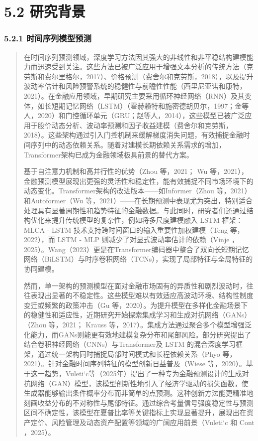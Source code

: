 \section{5.2 研究背景}

\subsubsection{5.2.1
时间序列模型预测}

\begin{quote}
在时间序列预测领域，深度学习方法因其强大的非线性和非平稳结构建模能力而迅速受到关注。这些方法已被广泛应用于增强文本分析的传统方法（克劳斯和费尔里格尔，2017）、价格预测（费舍尔和克劳斯，2018），以及提升波动率估计和风险预警系统的稳健性与前瞻性性能（西里尼亚诺和康特，2021）。在金融应用领域，早期研究主要采用循环神经网络（RNN）及其变体，如长短期记忆网络（LSTM）（霍赫赖特和施密德胡贝尔，1997；金等人，2020）和门控循环单元（GRU；赵等人，2014），这些模型已被广泛应用于股价动态分析、波动率预测和因子收益建模（费舍尔和克劳斯，2018）。这些架构通过引入门控机制来缓解梯度消失问题，有效捕捉金融时间序列中的动态依赖关系。随着对建模长期依赖关系需求的增加，Transformer架构已成为金融领域极具前景的替代方案。

基于自注意力机制和高并行性的优势（Zhou 等，2021； Wu
等，2021），金融预测模型展现出更强的灵活性和稳定性，能有效捕捉不同市场环境下的动态变化。Transformer架构的改进版本------如Informer（Zhou
等，2021）和Autoformer（Wu
等，2021）------在长期预测中表现尤为突出，特别适合处理具有显著周期性和趋势特征的金融数据。与此同时，研究者们还通过结构优化来提升传统模型的复杂性，例如将多尺度建模融入
LSTM 框架： MLCA - LSTM 技术支持跨时间窗口的输入重要性加权建模（Teng
等，2022），而 LSTM - MLP 则减少了对显式波动率估计的依赖（Vinje
，2025）。Wang（2023）更是在Transformer编码器中整合了双向长短期记忆网络（BiLSTM）与时序卷积网络（TCNs），实现了局部特征与全局特征的协同建模。

然而，单一架构的预测模型在面对金融市场固有的异质性和剧烈波动时，往往表现出显著的不稳定性。这些模型难以有效适应高波动环境、结构性制度变迁或频繁的政策冲击（Gu
等，2020）。为提升模型在多样化金融场景下的稳健性和适应性，近期研究开始探索集成学习和生成对抗网络（GANs）（Zhou
等，2021； Krauss
等，2017）。集成方法通过聚合多个模型增强泛化能力，而GANs则能更有效地建模复杂分布和尾部风险。部分研究提出了结合卷积神经网络（CNNs）与Transformer及
LSTM
的混合深度学习框架，通过统一架构同时捕捉局部时间模式和长程依赖关系（Phyo
等，2021）。针对金融时间序列特征的模型创新日益普及（Wiese
等，2020）。基于这一趋势，Vuleti`c等（2025年）提出了一种专为金融预测设计的生成对抗网络（GAN）模型，该模型创新性地引入了经济学驱动的损失函数，使生成器能够输出条件概率分布而非简单的点预测。这种创新方法能更精准地刻画收益分布的不对称性与尾部特征。通过综合考量信号强度稳定性与预测区间不确定性，该模型在夏普比率等关键指标上实现显著提升，展现出在资产定价、风险管理及动态资产配置等领域的广阔应用前景（Vuleti`c
和 Cont ，2025）。
\end{quote}

